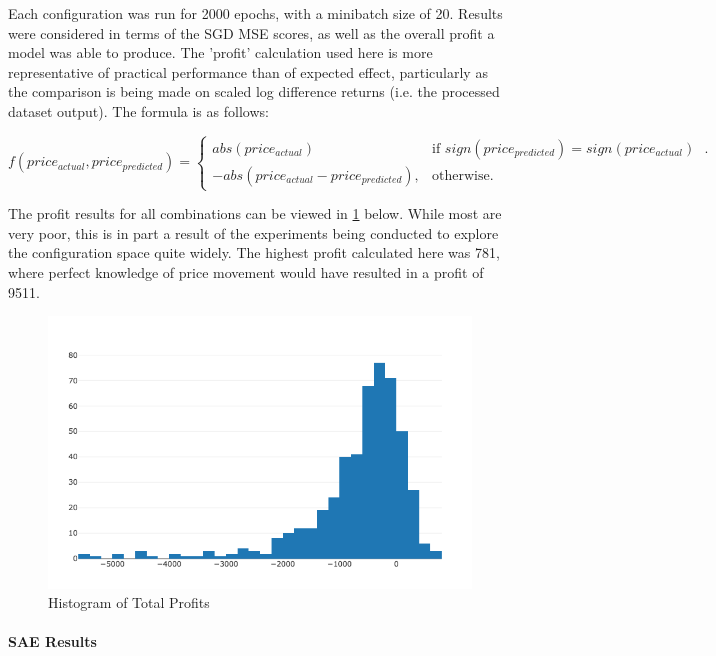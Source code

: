 \documentclass[a4paper,latin]{paper}
\begin{document}
Each configuration was run for 2000 epochs, with a minibatch size of 20. Results were considered in terms of the SGD MSE scores, as well as the overall profit a model was able to produce. The 'profit' calculation used here is more representative of practical performance than of expected effect, particularly as the comparison is being made on scaled log difference returns (i.e. the processed dataset output). The formula is as follows:

\begin{equation}\label{func_profit}
f(price_{actual}, price_{predicted})=\begin{cases}
	abs(price_{actual}) & \text{if $sign(price_{predicted})=sign(price_{actual})$ }.\\
	- abs(price_{actual} - price_{predicted}), & \text{otherwise}.
\end{cases}
\end{equation}

The profit results for all combinations can be viewed in \ref{figure-synthetic-profit-pdf} below. While most are very poor, this is in part a result of the experiments being conducted to explore the configuration space quite widely. The highest profit calculated here was 781, where perfect knowledge of price movement would have resulted in a profit of 9511.

\begin{figure}[H]
	\centering \includegraphics[scale=0.5]{images/synthetic_results/profit_histogram.png}
	\caption{Histogram of Total Profits}
	\label{figure-synthetic-profit-pdf}
\end{figure}

\paragraph{SAE Results}\mbox{}\\
\end{document}
